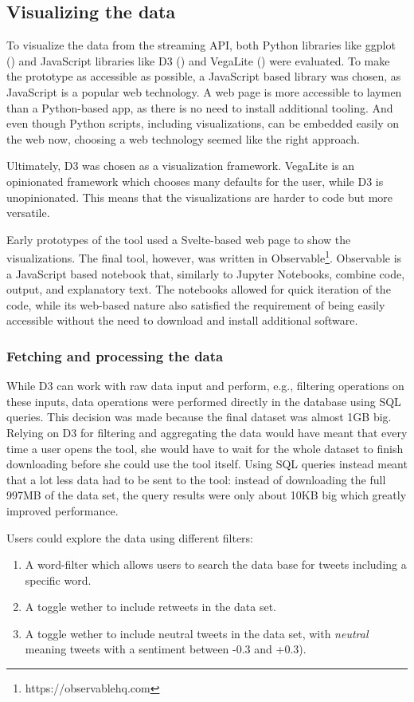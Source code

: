 \subsection{Visualizing the data}
To visualize the data from the streaming API, both Python libraries like ggplot (\cite{wickham2016}) and JavaScript libraries like D3 (\cite{bostock}) and VegaLite (\cite{uwidl}) were evaluated. To make the prototype as accessible as possible, a JavaScript based library was chosen, as JavaScript is a popular web technology. A web page is more accessible to laymen than a Python-based app, as there is no need to install additional tooling. And even though Python scripts, including visualizations, can be embedded easily on the web now, choosing a web technology seemed like the right approach.

Ultimately, D3 was chosen as a visualization framework. VegaLite is an opinionated framework which chooses many defaults for the user, while D3 is unopinionated. This means that the visualizations are harder to code but more versatile.

Early prototypes of the tool used a Svelte-based web page to show the visualizations. The final tool, however, was written in Observable\footnote{https://observablehq.com}. Observable is a JavaScript based notebook that, similarly to Jupyter Notebooks, combine code, output, and explanatory text. The notebooks allowed for quick iteration of the code, while its web-based nature also satisfied the requirement of being easily accessible without the need to download and install additional software.

\subsubsection{Fetching and processing the data}
While D3 can work with raw data input and perform, e.g., filtering operations on these inputs, data operations were performed directly in the database using SQL queries. This decision was made because the final dataset was almost 1GB big. Relying on D3 for filtering and aggregating the data would have meant that every time a user opens the tool, she would have to wait for the whole dataset to finish downloading before she could use the tool itself. Using SQL queries instead meant that a lot less data had to be sent to the tool: instead of downloading the full 997MB of the data set, the query results were only about 10KB big which greatly improved performance.

Users could explore the data using different filters:
\begin{enumerate}
    \item A word-filter which allows users to search the data base for tweets including a specific word.
    \item A toggle wether to include retweets in the data set.
    \item A toggle wether to include neutral tweets in the data set, with \emph{neutral} meaning tweets with a sentiment between -0.3 and +0.3). %
\end{enumerate}

